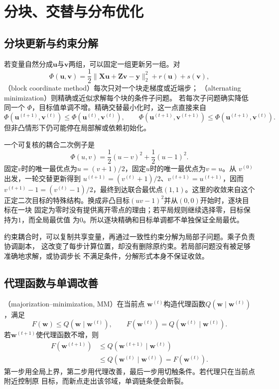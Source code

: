 \section{分块、交替与分布优化}
\label{sec:opt-block-alternating-distribution}

\subsection{分块更新与约束分解}

若变量自然分成$\bm{u}$与$\bm{v}$两组，可以固定一组更新另一组。对
\[
  \Phi(\bm{u},\bm{v})
  =\frac12\lVert\bm{X}\bm{u}+\bm{Z}\bm{v}-\bm{y}\rVert_2^2
  +r(\bm{u})+s(\bm{v}),
\]
（block coordinate method）每次只对一个块走梯度或近端步；
（alternating minimization）则精确或近似求解每个块的条件子问题。
若每次子问题确实降低同一个
$\Phi$，目标值单调不增。精确交替最小化时，这一点直接来自
\[
  \Phi(\bm{u}^{(t+1)},\bm{v}^{(t)})
  \leq\Phi(\bm{u}^{(t)},\bm{v}^{(t)}),\qquad
  \Phi(\bm{u}^{(t+1)},\bm{v}^{(t+1)})
  \leq\Phi(\bm{u}^{(t+1)},\bm{v}^{(t)}).
\]
但非凸情形下仍可能停在局部解或依赖初始化。

一个可复核的耦合二次例子是
\[
  \Phi(u,v)=\frac12(u-v)^2+\frac12(u-1)^2.
\]
固定$v$时的唯一最优点为$u=(v+1)/2$，固定$u$时的唯一最优点为$v=u$。从
$v^{(0)}$出发，一轮交替更新得到
$u^{(t+1)}=(v^{(t)}+1)/2$、$v^{(t+1)}=u^{(t+1)}$，因而
$v^{(t+1)}-1=(v^{(t)}-1)/2$，最终到达联合最优点$(1,1)$。这里的收敛来自这个
正定二次目标的特殊结构。换成非凸目标$(uv-1)^2$并从$(0,0)$开始时，逐块目标在一块
固定为零时没有提供离开零点的理由；若平局规则继续选择零，目标保持为$1$，而全局最优值
为$0$。所以逐块精确和目标单调都不单独保证全局最优。

约束耦合时，可以复制共享变量，再通过一致性约束分解为局部子问题。乘子负责协调副本，
这改变了每步计算位置，却没有删除原约束。若局部问题没有被足够准确地求解，或协调步长
不满足条件，分解形式本身不保证收敛。

\subsection{代理函数与单调改善}

（majorization--minimization, MM）在当前点
$\bm{w}^{(t)}$构造代理函数$Q(\bm{w}\mid\bm{w}^{(t)})$，满足
\[
  F(\bm{w})\leq Q(\bm{w}\mid\bm{w}^{(t)}),
  \qquad
  F(\bm{w}^{(t)})=Q(\bm{w}^{(t)}\mid\bm{w}^{(t)}).
\]
若$\bm{w}^{(t+1)}$使代理函数不增，则
\begin{align*}
  F(\bm{w}^{(t+1)})
  &\leq Q(\bm{w}^{(t+1)}\mid\bm{w}^{(t)})\\
  &\leq Q(\bm{w}^{(t)}\mid\bm{w}^{(t)})
  =F(\bm{w}^{(t)}).
\end{align*}
第一步用全局上界，第二步用代理改善，最后一步用切触条件。若代理只在当前点附近控制原
目标，而新点走出该邻域，单调链条便会断裂。

